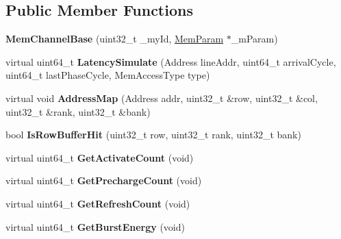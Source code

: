 \subsection*{Public Member Functions}
\begin{DoxyCompactItemize}
\item 
\hypertarget{classMemChannelBase_a2e476e5df6a1f1a2af74176f5f430780}{{\bfseries Mem\-Channel\-Base} (uint32\-\_\-t \-\_\-my\-Id, \hyperlink{classMemParam}{Mem\-Param} $\ast$\-\_\-m\-Param)}\label{classMemChannelBase_a2e476e5df6a1f1a2af74176f5f430780}

\item 
\hypertarget{classMemChannelBase_a5fb78770709c769c6d0f360420b7ff3c}{virtual uint64\-\_\-t {\bfseries Latency\-Simulate} (Address line\-Addr, uint64\-\_\-t arrival\-Cycle, uint64\-\_\-t last\-Phase\-Cycle, Mem\-Access\-Type type)}\label{classMemChannelBase_a5fb78770709c769c6d0f360420b7ff3c}

\item 
\hypertarget{classMemChannelBase_a48733e49e1666216025e1881f4fa061e}{virtual void {\bfseries Address\-Map} (Address addr, uint32\-\_\-t \&row, uint32\-\_\-t \&col, uint32\-\_\-t \&rank, uint32\-\_\-t \&bank)}\label{classMemChannelBase_a48733e49e1666216025e1881f4fa061e}

\item 
\hypertarget{classMemChannelBase_a7e37609da4d99dcf76b94e85e76d6f3d}{bool {\bfseries Is\-Row\-Buffer\-Hit} (uint32\-\_\-t row, uint32\-\_\-t rank, uint32\-\_\-t bank)}\label{classMemChannelBase_a7e37609da4d99dcf76b94e85e76d6f3d}

\item 
\hypertarget{classMemChannelBase_a20d5444e086ec2ecb502eeb2bcf198ca}{virtual uint64\-\_\-t {\bfseries Get\-Activate\-Count} (void)}\label{classMemChannelBase_a20d5444e086ec2ecb502eeb2bcf198ca}

\item 
\hypertarget{classMemChannelBase_a42edfd2e48dc62f4736ad0fb341673ea}{virtual uint64\-\_\-t {\bfseries Get\-Precharge\-Count} (void)}\label{classMemChannelBase_a42edfd2e48dc62f4736ad0fb341673ea}

\item 
\hypertarget{classMemChannelBase_af57764a13bc54314580b76f93b36e06e}{virtual uint64\-\_\-t {\bfseries Get\-Refresh\-Count} (void)}\label{classMemChannelBase_af57764a13bc54314580b76f93b36e06e}

\item 
\hypertarget{classMemChannelBase_ac4fe84eb254e133f47708a32c9a86c01}{virtual uint64\-\_\-t {\bfseries Get\-Burst\-Energy} (void)}\label{classMemChannelBase_ac4fe84eb254e133f47708a32c9a86c01}


\end{DoxyCompactItemize}
